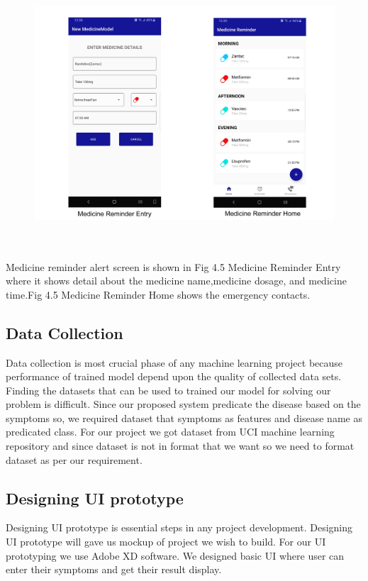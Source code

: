 \begin{figure}[H]
\begin{center}
\includegraphics[width=145mm, height = 100mm]{Outputnew/4.png}
\caption{}
\end{center}
\end{figure}


Medicine reminder alert screen is shown in Fig 4.5 Medicine Reminder Entry where it shows detail about the medicine name,medicine dosage, and medicine time.Fig 4.5 Medicine Reminder Home shows the emergency contacts.

  

\subsection{Data Collection}
Data collection is most crucial phase of any machine learning project because performance of trained model depend upon the quality of collected data sets. Finding the datasets that can be used to trained our model for solving our problem is difficult. Since our proposed system predicate the disease based on the symptoms so, we required dataset that symptoms as features and disease name as predicated class. For our project we got dataset from UCI machine learning repository and since dataset is not in format that we want so we need to format dataset as per our requirement.

\subsection{Designing UI prototype}
Designing UI prototype is essential steps in any project development. Designing UI prototype will gave us mockup of project we wish to build. For our UI prototyping we use Adobe XD software. We designed basic UI where user can enter their symptoms and get their result display.

